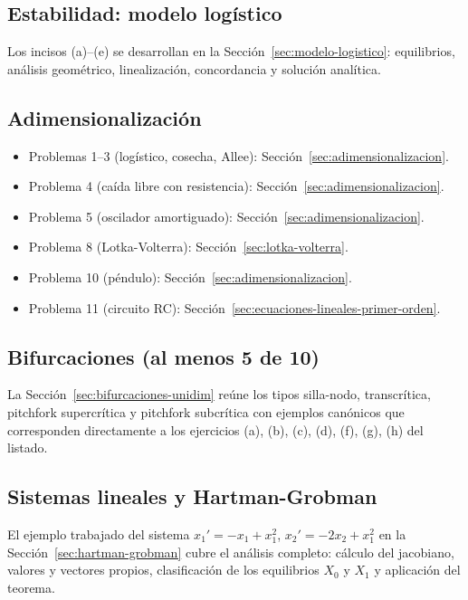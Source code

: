 \documentclass[11pt,letterpaper]{article}
\begin{document}
\subsection{Estabilidad: modelo logístico}

Los incisos (a)--(e) se desarrollan en la Sección~\ref{sec:modelo-logistico}:
equilibrios, análisis geométrico, linealización, concordancia y solución analítica.

\subsection{Adimensionalización}

\begin{itemize}
    \item Problemas 1--3 (logístico, cosecha, Allee): Sección~\ref{sec:adimensionalizacion}.
    \item Problema 4 (caída libre con resistencia): Sección~\ref{sec:adimensionalizacion}.
    \item Problema 5 (oscilador amortiguado): Sección~\ref{sec:adimensionalizacion}.
    \item Problema 8 (Lotka-Volterra): Sección~\ref{sec:lotka-volterra}.
    \item Problema 10 (péndulo): Sección~\ref{sec:adimensionalizacion}.
    \item Problema 11 (circuito RC): Sección~\ref{sec:ecuaciones-lineales-primer-orden}.
\end{itemize}

\subsection{Bifurcaciones (al menos 5 de 10)}

La Sección~\ref{sec:bifurcaciones-unidim} reúne los tipos silla-nodo,
transcrítica, pitchfork supercrítica y pitchfork subcrítica con ejemplos
canónicos que corresponden directamente a los ejercicios (a), (b), (c), (d),
(f), (g), (h) del listado.

\subsection{Sistemas lineales y Hartman-Grobman}

El ejemplo trabajado del sistema $x_1'=-x_1+x_1^2$, $x_2'=-2x_2+x_1^2$
en la Sección~\ref{sec:hartman-grobman} cubre el análisis completo:
cálculo del jacobiano, valores y vectores propios, clasificación de los
equilibrios $X_0$ y $X_1$ y aplicación del teorema.
\end{document}
